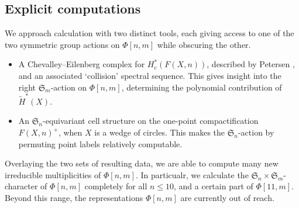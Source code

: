 \documentclass[12pt]{article}
\newcommand{\kk}{\mathbbm{k}}
\newcommand{\SymGroup}[1][n]{\mathfrak{S}_{#1}}
\DeclareMathOperator{\Out}{Out}
\theoremstyle{plain}
\theoremstyle{definition}
\theoremstyle{remark}
\begin{document}

\subsection{Explicit computations}\label{sec:explicit computation}
We approach calculation with two distinct tools, each giving access to one of the two symmetric group actions on $\Phi[n,m]$ while obscuring the other.
\begin{itemize}
    \item A Chevalley--Eilenberg complex for $H^*_c(F(X,n))$, described by Petersen \cite{Pet20}, and an associated `collision' spectral sequence. This gives insight into the right $\SymGroup[m]$-action on $\Phi[n,m]$, determining the polynomial contribution of $\tilde{H}^*(X)$.
    \item An $\SymGroup$-equivariant cell structure on the one-point compactification $F(X,n)^+$, when $X$ is a wedge of circles. This makes the $\SymGroup$-action by permuting point labels relatively computable.
\end{itemize}
Overlaying the two sets of resulting data, we are able to compute many new irreducible multiplicities of $\Phi[n,m]$. In particualr, we calculate the $\SymGroup\times\SymGroup[m]$-character of $\Phi[n,m]$ completely for all $n\leq 10$, and a certain part of $\Phi[11,m]$. Beyond this range, the representations $\Phi[n,m]$ are currently out of reach.
\end{document}
